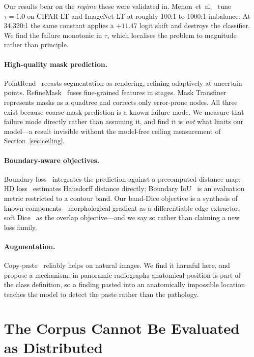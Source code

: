 \documentclass[10pt,twocolumn,letterpaper]{article}
\begin{document}
Our results bear on the \emph{regime} these were validated in.
Menon~et~al.~\cite{menon2021logit} tune $\tau=1.0$ on CIFAR-LT and ImageNet-LT
at roughly 100:1 to 1000:1 imbalance. At 34{,}320:1 the same constant applies a
$+11.47$ logit shift and destroys the classifier. We find the failure monotonic
in $\tau$, which localises the problem to magnitude rather than principle.

\paragraph{High-quality mask prediction.}
PointRend~\cite{kirillov2020pointrend} recasts segmentation as rendering,
refining adaptively at uncertain points. RefineMask~\cite{zhang2021refinemask}
fuses fine-grained features in stages. Mask
Transfiner~\cite{ke2022transfiner} represents masks as a quadtree and corrects
only error-prone nodes. All three exist because coarse mask prediction is a
known failure mode. We measure that failure mode directly rather than assuming
it, and find it is \emph{not} what limits our model---a result invisible without
the model-free ceiling measurement of Section~\ref{sec:ceiling}.

\paragraph{Boundary-aware objectives.}
Boundary loss~\cite{kervadec2018boundary} integrates the prediction against a
precomputed distance map; HD loss~\cite{karimi2019hausdorff} estimates Hausdorff
distance directly; Boundary IoU~\cite{cheng2021boundaryiou} is an evaluation
metric restricted to a contour band. Our band-Dice objective is a synthesis of
known components---morphological gradient as a differentiable edge extractor,
soft Dice~\cite{milletari2016vnet} as the overlap objective---and we say so
rather than claiming a new loss family.

\paragraph{Augmentation.}
Copy-paste~\cite{ghiasi2021copypaste} reliably helps on natural images. We find
it harmful here, and propose a mechanism: in panoramic radiographs anatomical
position is part of the class definition, so a finding pasted into an
anatomically impossible location teaches the model to detect the paste rather
than the pathology.

\section{The Corpus Cannot Be Evaluated as Distributed}
\end{document}
